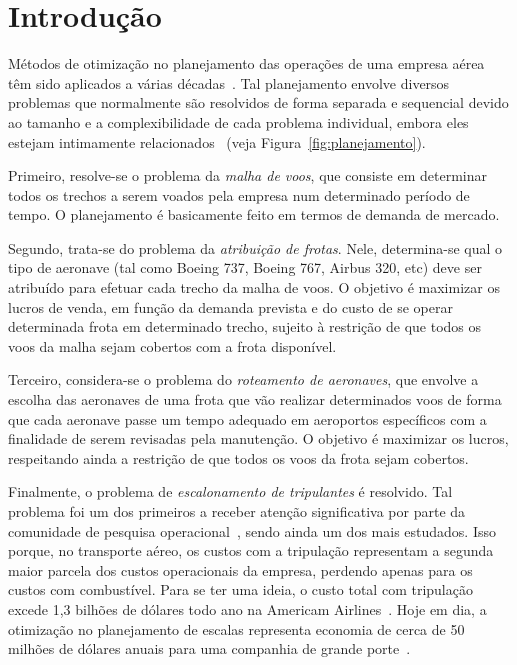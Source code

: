 \zerar
\chapter{Introdução}
\label{cap:introducao}

Métodos de otimização no planejamento das operações de uma empresa aérea têm sido aplicados a várias
décadas~\cite{yu}. Tal planejamento envolve diversos problemas que normalmente são resolvidos de
forma separada e sequencial devido ao tamanho e a complexibilidade de cada problema individual,
embora eles estejam intimamente relacionados~\cite{barnhart03} (veja Figura~\ref{fig:planejamento}).

Primeiro, resolve-se o problema da \emph{malha de voos}, que consiste em determinar todos os trechos
a serem voados pela empresa num determinado período de tempo. O planejamento é basicamente feito em
termos de demanda de mercado.

Segundo, trata-se do problema da \emph{atribuição de frotas}. Nele, determina-se qual o tipo de
aeronave (tal como Boeing 737, Boeing 767, Airbus 320, etc) deve ser atribuído para efetuar cada
trecho da malha de voos. O objetivo é maximizar os lucros de venda, em função da demanda prevista e
do custo de se operar determinada frota em determinado trecho, sujeito à restrição de que todos os
voos da malha sejam cobertos com a frota disponível.

Terceiro, considera-se o problema do \emph{roteamento de aeronaves}, que envolve a escolha das
aeronaves de uma frota que vão realizar determinados voos de forma que cada aeronave passe um tempo
adequado em aeroportos específicos com a finalidade de serem revisadas pela manutenção. O objetivo é
maximizar os lucros, respeitando ainda a restrição de que todos os voos da frota sejam cobertos.

Finalmente, o problema de \emph{escalonamento de tripulantes} é resolvido. Tal problema foi um dos
primeiros a receber atenção significativa por parte da comunidade de pesquisa
operacional~\cite{arabeyre69}, sendo ainda um dos mais estudados. Isso porque, no transporte aéreo,
os custos com a tripulação representam a segunda maior parcela dos custos operacionais da empresa,
perdendo apenas para os custos com combustível. Para se ter uma ideia, o custo total com tripulação
excede 1,3 bilhões de dólares todo ano na Americam Airlines~\cite{anbil91a}. Hoje em dia, a
otimização no planejamento de escalas representa economia de cerca de 50 milhões de dólares anuais
para uma companhia de grande porte~\cite{barnhart03}.


